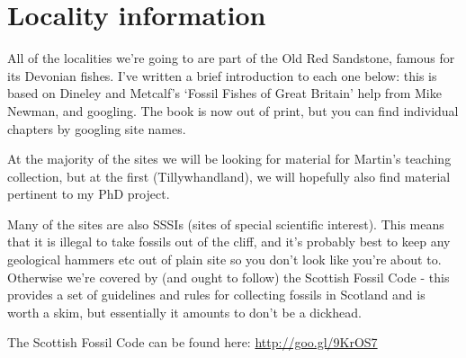 \documentclass[12pt,letterpaper]{article}
\begin{document}
\pagebreak


\section{Locality information}

\indent All of the localities we're going to are part of the Old Red Sandstone, famous for its Devonian fishes.  I've written a brief introduction to each one below: this is based on Dineley and Metcalf's `Fossil Fishes of Great Britain' help from Mike Newman, and googling.  The book is now out of print, but you can find individual chapters by googling site names. \newline

At the majority of the sites we will be looking for material for Martin's teaching collection, but at the first (Tillywhandland), we will hopefully also find material pertinent to my PhD project. \newline

Many of the sites are also SSSIs (sites of special scientific interest).  This means that it is illegal to take fossils out of the cliff, and it's probably best to keep any geological hammers etc out of plain site so you don't look like you're about to. Otherwise we're covered by (and ought to follow) the Scottish Fossil Code - this provides a set of guidelines and rules for collecting fossils in Scotland and is worth a skim, but essentially it amounts to don't be a dickhead.  \newline

The Scottish Fossil Code can be found here: \url{http://goo.gl/9KrOS7}
\end{document}
